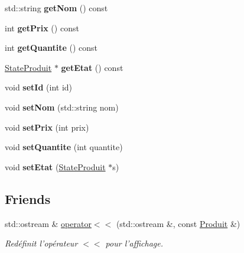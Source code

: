 \begin{DoxyCompactItemize}
\item 
\hypertarget{classProduit_a7a2d68cac6e51dffa6273fefe38ad418}{std\-::string {\bfseries get\-Nom} () const }\label{classProduit_a7a2d68cac6e51dffa6273fefe38ad418}

\item 
\hypertarget{classProduit_afd2ea2c2b4ec2ba66c8b445a13c748bc}{int {\bfseries get\-Prix} () const }\label{classProduit_afd2ea2c2b4ec2ba66c8b445a13c748bc}

\item 
\hypertarget{classProduit_a001097d6d954a23600d7dd9c31aec885}{int {\bfseries get\-Quantite} () const }\label{classProduit_a001097d6d954a23600d7dd9c31aec885}

\item 
\hypertarget{classProduit_a41272a691eb0146f16014fb62a8f2bbb}{\hyperlink{classStateProduit}{State\-Produit} $\ast$ {\bfseries get\-Etat} () const }\label{classProduit_a41272a691eb0146f16014fb62a8f2bbb}

\item 
\hypertarget{classProduit_a15ecb54571cc8dd4dffc0504eaedf47d}{void {\bfseries set\-Id} (int id)}\label{classProduit_a15ecb54571cc8dd4dffc0504eaedf47d}

\item 
\hypertarget{classProduit_a5f3c3093a4da08326e4b45c1faf781dc}{void {\bfseries set\-Nom} (std\-::string nom)}\label{classProduit_a5f3c3093a4da08326e4b45c1faf781dc}

\item 
\hypertarget{classProduit_a84217d61e98deed8a84bdff1f3b3f0f6}{void {\bfseries set\-Prix} (int prix)}\label{classProduit_a84217d61e98deed8a84bdff1f3b3f0f6}

\item 
\hypertarget{classProduit_ad48ae2fb835f6819b45a987b6ed400c1}{void {\bfseries set\-Quantite} (int quantite)}\label{classProduit_ad48ae2fb835f6819b45a987b6ed400c1}

\item 
\hypertarget{classProduit_ad457c563ee0a5e69159f642f9fa831b5}{void {\bfseries set\-Etat} (\hyperlink{classStateProduit}{State\-Produit} $\ast$s)}\label{classProduit_ad457c563ee0a5e69159f642f9fa831b5}

\end{DoxyCompactItemize}
\subsection*{Friends}
\begin{DoxyCompactItemize}
\item 
\hypertarget{classProduit_ad116eeba9bbfc17a03f290ad48b408c0}{std\-::ostream \& \hyperlink{classProduit_ad116eeba9bbfc17a03f290ad48b408c0}{operator$<$$<$} (std\-::ostream \&, const \hyperlink{classProduit}{Produit} \&)}\label{classProduit_ad116eeba9bbfc17a03f290ad48b408c0}

\begin{DoxyCompactList}\small\item\em Redéfinit l'opérateur $<$$<$ pour l'affichage. \end{DoxyCompactList}\end{DoxyCompactItemize}


